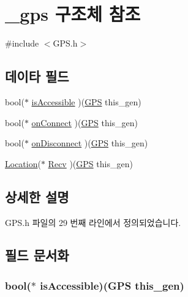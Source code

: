 \hypertarget{struct__gps}{\section{\-\_\-gps 구조체 참조}
\label{struct__gps}
}


{\ttfamily \#include $<$G\-P\-S.\-h$>$}

\subsection*{데이타 필드}
\begin{DoxyCompactItemize}
\item 
bool($\ast$ \hyperlink{struct__gps_ab422e6e9531279ce2cf7836d6fdad824}{is\-Accessible} )(\hyperlink{_g_p_s_8h_abd7b5738587f7a619dbeddcd69e8a319}{G\-P\-S} this\-\_\-gen)
\item 
bool($\ast$ \hyperlink{struct__gps_ac1e7688363e326df6919afc5d8cc848c}{on\-Connect} )(\hyperlink{_g_p_s_8h_abd7b5738587f7a619dbeddcd69e8a319}{G\-P\-S} this\-\_\-gen)
\item 
bool($\ast$ \hyperlink{struct__gps_a7ad2cd5581984147767aa12d71a7ff74}{on\-Disconnect} )(\hyperlink{_g_p_s_8h_abd7b5738587f7a619dbeddcd69e8a319}{G\-P\-S} this\-\_\-gen)
\item 
\hyperlink{_g_p_s_8h_ac4745ca529cacca07c33d7d83cce62c9}{Location}($\ast$ \hyperlink{struct__gps_a983b023f987a119a6df5c57b8a998f61}{Recv} )(\hyperlink{_g_p_s_8h_abd7b5738587f7a619dbeddcd69e8a319}{G\-P\-S} this\-\_\-gen)
\end{DoxyCompactItemize}


\subsection{상세한 설명}


G\-P\-S.\-h 파일의 29 번째 라인에서 정의되었습니다.



\subsection{필드 문서화}
\hypertarget{struct__gps_ab422e6e9531279ce2cf7836d6fdad824}{
\subsubsection[{is\-Accessible}]{\setlength{\rightskip}{0pt plus 5cm}bool($\ast$  is\-Accessible)({\bf G\-P\-S} this\-\_\-gen)}}\label{struct__gps_ab422e6e9531279ce2cf7836d6fdad824}


